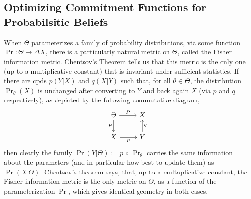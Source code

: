 


\subsection{Optimizing Commitment Functions for Probabilsitic Beliefs}
When $\Theta$ parameterizes a family of probability distributions, via some function $\Pr : \Theta \to \Delta X$, there is a particularly natural metric on $\Theta$, called the Fisher information metric.
Chentsov's Theorem \cite{chentsov} tells us that this metric is the only one (up to a multiplicative constant) that is invariant under sufficient statistics. 
If there are cpds $p(Y|X)$ and $q(X|Y)$ such that, for all $\theta \in \Theta$,
the distribution $\Pr_{\theta}(X)$ is unchanged after converting to $Y$ and back again $X$ (via $p$ and $q$ respectively), as depicted by the following commutative diagram,
\[
	\begin{tikzcd}
		\Theta \ar[r,"\Pr"]\ar[d,"\Pr"']
			& X \\
		X \ar[r,"p"'] & Y \ar[u, "q"']
	\end{tikzcd}
\]
then clearly the family $\Pr(Y|\Theta) := p\,\circ\,\Pr_{\theta}$ carries the same information about the parameters (and in particular how best to update them) as $\Pr(X|\Theta)$.
Chentsov's theorem says, that, up to a multaplicative constant, the Fisher information metric is the only metric on $\Theta$, as a function of the parameterization $\Pr$, which gives identical geometry in both cases.


